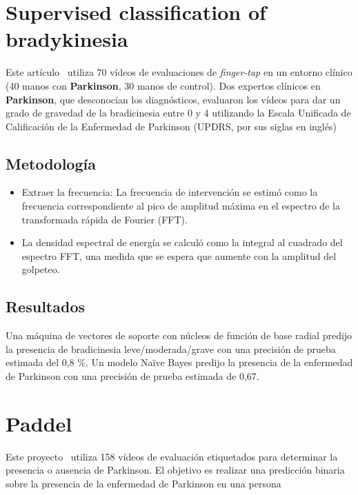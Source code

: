 \section{Supervised classification of bradykinesia}
Este artículo~\cite{williams2020supervised} utiliza 70 vídeos de evaluaciones de \textit{finger-tap} en un entorno clínico (40 manos con \textbf{Parkinson}, 30 manos de control).
Dos expertos clínicos en \textbf{Parkinson}, que desconocían los diagnósticos, evaluaron los vídeos para dar un grado de gravedad de la bradicinesia entre 0 y 4 utilizando la Escala Unificada de Calificación de la Enfermedad de Parkinson (UPDRS, por sus siglas en inglés)


\subsection{Metodología}
\begin{itemize}
	\item Extraer la frecuencia: La frecuencia de intervención se estimó como la frecuencia correspondiente al pico de amplitud máxima en el espectro de la transformada rápida de Fourier (FFT). 
	\item La densidad espectral de energía se calculó como la integral al cuadrado del espectro FFT, una medida que se espera que aumente con la amplitud del golpeteo.
\end{itemize}
\subsection{Resultados}
Una máquina de vectores de soporte con núcleos de función de base radial predijo la presencia de bradicinesia leve/moderada/grave con una precisión de prueba estimada del 0,8 \%.
Un modelo Naïve Bayes predijo la presencia de la enfermedad de Parkinson con una precisión de prueba estimada de 0,67. 

\section{Paddel}

Este proyecto~\cite{paddelRepo} utiliza 158 vídeos de evaluación etiquetados para determinar la presencia o ausencia de Parkinson. El objetivo es realizar una predicción binaria sobre la presencia de la enfermedad de Parkinson en una persona

